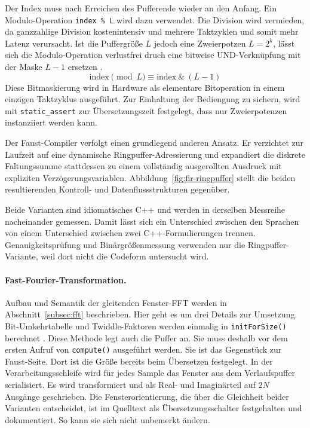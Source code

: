 Der Index muss nach Erreichen des Pufferende wieder an den Anfang. Ein Modulo-Operation \texttt{index \% L} wird dazu verwendet. Die Division wird vermieden, da ganzzahlige Division kostenintensiv und mehrere Taktzyklen und somit mehr Latenz verursacht. Ist die Puffergröße $L$ jedoch eine Zweierpotzen $L = 2^k$, lässt sich die Modulo-Operation verlustfrei druch eine bitweise UND-Verknüpfung mit der Maske $L - 1$ ersetzen \parencite{warren2013hackers}.
\begin{equation}
	\text{index} \pmod L \equiv \text{index} \ \& \ (L - 1)
\end{equation}
Diese Bitmaskierung wird in Hardware als elementare Bitoperation in einem einzigen Taktzyklus ausgeführt. Zur Einhaltung der Bediengung zu sichern, wird mit \texttt{static\_assert} zur Übersetzungszeit festgelegt, dass nur Zweierpotenzen instanziiert werden kann.

Der Faust-Compiler verfolgt einen grundlegend anderen Ansatz. Er verzichtet zur Laufzeit auf eine dynamische Ringpuffer-Adressierung und expandiert die diskrete Faltungssumme stattdessen zu einem vollständig ausgerollten Ausdruck mit expliziten Verzögerungsvariablen. Abbildung~\ref{fig:fir-ringpuffer} stellt die beiden resultierenden Kontroll- und Datenflussstrukturen gegenüber.

Beide Varianten sind idiomatisches C++ und werden in derselben Messreihe nacheinander gemessen. Damit lässt sich ein Unterschied zwischen den Sprachen von einem Unterschied zwischen zwei C++-Formulierungen trennen. Genauigkeitsprüfung und Binärgrößenmessung verwenden nur die Ringpuffer-Variante, weil dort nicht die Codeform untersucht wird.

\paragraph{Fast-Fourier-Transformation.}
Aufbau und Semantik der gleitenden Fenster-FFT werden in Abschnitt~\ref{subsec:fft} beschrieben. Hier geht es um drei Details zur Umsetzung. Bit-Umkehrtabelle und Twiddle-Faktoren werden einmalig in \texttt{initForSize()} berechnet \parencite{lyons2004understanding}. Diese Methode legt auch die Puffer an. Sie muss deshalb vor dem ersten Aufruf von \texttt{compute()} ausgeführt werden. Sie ist das Gegenstück zur Faust-Seite. Dort ist die Größe bereits beim Übersetzen festgelegt. In der Verarbeitungsschleife wird für jedes Sample das Fenster aus dem Verlaufspuffer serialisiert. Es wird transformiert und als Real- und Imaginärteil auf $2N$ Ausgänge geschrieben. Die Fensterorientierung, die über die Gleichheit beider Varianten entscheidet, ist im Quelltext als Übersetzungsschalter festgehalten und dokumentiert. So kann sie sich nicht unbemerkt ändern.

